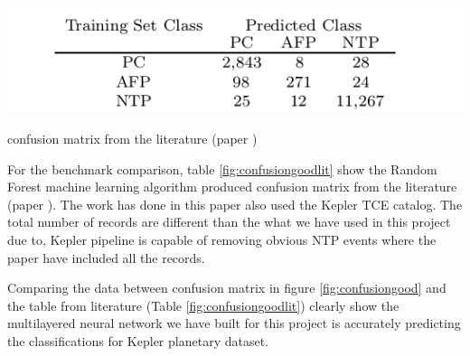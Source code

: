 \begin{table}[!h]
\begin{center}
        \includegraphics[width=0.5\textheight]{img/randomforest_confmat.png}
        \caption{confusion matrix from the literature (paper \cite{2015ApJ...806....6M})}  \label{fig:confusiongoodlit}
\end{center}
\end{table}

For the benchmark comparison, table \ref{fig:confusiongoodlit} show the Random Forest machine learning algorithm produced confusion matrix from the literature (paper \cite{2015ApJ...806....6M}).  The work has done in this paper \cite{2015ApJ...806....6M} also used the Kepler TCE catalog. The total number of records are different than the what we have used in this project due to, Kepler pipeline is capable of removing obvious NTP events where the paper have included all the records. 


Comparing the data between confusion matrix in figure \ref{fig:confusiongood} and the table from literature (Table \ref{fig:confusiongoodlit}) clearly show the multilayered neural network we have built for this project is accurately predicting the classifications for Kepler planetary dataset. 

